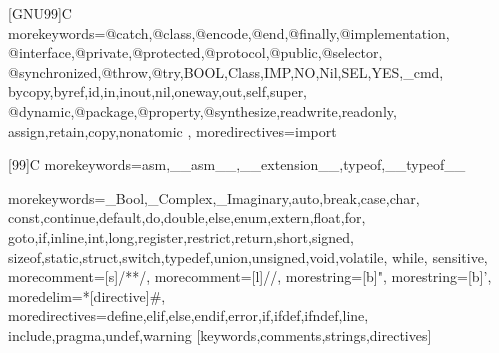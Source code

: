 


\newcommand{\mawapp}{i\-Path\-Case-SMDA\xspace}
\newcommand{\mawappp}{i\-Path\-Case-SMDA's\xspace}
\newcommand{\keggapp}{i\-Path\-Case-KEGG\xspace}
\newcommand{\keggappp}{i\-Path\-Case-KEGG's\xspace}
\newcommand{\ozsoyoglu}{\"{O}zsoyo\u{g}lu\xspace}


[GNU99]{C}
  {morekeywords={@catch,@class,@encode,@end,@finally,@implementation,%
      @interface,@private,@protected,@protocol,@public,@selector,%
      @synchronized,@throw,@try,BOOL,Class,IMP,NO,Nil,SEL,YES,_cmd,%
      bycopy,byref,id,in,inout,nil,oneway,out,self,super,%
      @dynamic,@package,@property,@synthesize,readwrite,readonly,%
      assign,retain,copy,nonatomic%
      },%
   moredirectives={import}%
}%

[99]{C}
  {morekeywords={asm,__asm__,__extension__,typeof,__typeof__}%
}%

%
  {morekeywords={_Bool,_Complex,_Imaginary,auto,break,case,char,%
      const,continue,default,do,double,else,enum,extern,float,for,%
      goto,if,inline,int,long,register,restrict,return,short,signed,%
      sizeof,static,struct,switch,typedef,union,unsigned,void,volatile,%
      while},%
   sensitive,%
   morecomment=[s]{/*}{*/},%
   morecomment=[l]//,%
   morestring=[b]",%
   morestring=[b]',%
   moredelim=*[directive]\#,%
   moredirectives={define,elif,else,endif,error,if,ifdef,ifndef,line,%
      include,pragma,undef,warning}%
}[keywords,comments,strings,directives]%


\lstset{language=[Objective]C, breakindent=40pt, breaklines}


{\singlespacing\lstset{language=[Objective]C}}
{}
{\singlespacing\lstset{language=[xml]}}
{}
